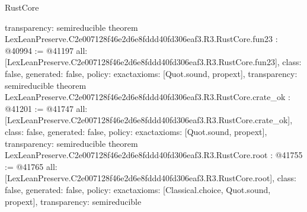 \begin{lexlean}{RustCore}
\begin{coremodule}
{  transparency: semireducible
}
theorem LexLeanPreserve.C2e007128f46e2d6e8fddd40fd306eaf3.R3.RustCore.fun23 : @40994 := @41197 {
  all: [LexLeanPreserve.C2e007128f46e2d6e8fddd40fd306eaf3.R3.RustCore.fun23],
  class: false,
  generated: false,
  policy: exact{axioms: [Quot.sound, propext]},
  transparency: semireducible
}
theorem LexLeanPreserve.C2e007128f46e2d6e8fddd40fd306eaf3.R3.RustCore.crate_ok : @41201 := @41747 {
  all: [LexLeanPreserve.C2e007128f46e2d6e8fddd40fd306eaf3.R3.RustCore.crate_ok],
  class: false,
  generated: false,
  policy: exact{axioms: [Quot.sound, propext]},
  transparency: semireducible
}
theorem LexLeanPreserve.C2e007128f46e2d6e8fddd40fd306eaf3.R3.RustCore.root : @41755 := @41765 {
  all: [LexLeanPreserve.C2e007128f46e2d6e8fddd40fd306eaf3.R3.RustCore.root],
  class: false,
  generated: false,
  policy: exact{axioms: [Classical.choice, Quot.sound, propext]},
  transparency: semireducible
}


\end{coremodule}
\end{lexlean}
